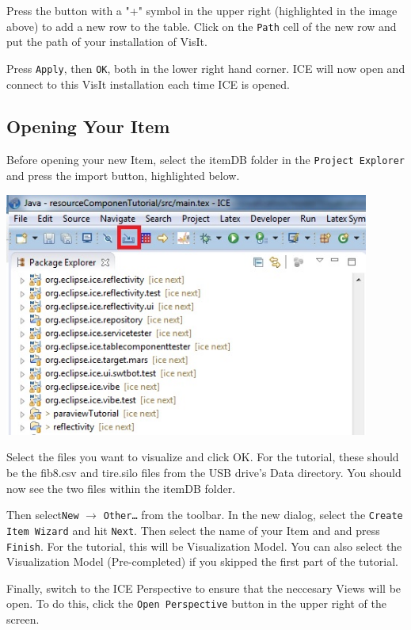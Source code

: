 \documentclass{article}
\begin{document}
Press the button with a "+" symbol in the upper right (highlighted in the image
above) to add a new row to the table. Click on the \texttt{Path} cell of the new
row and put the path of your installation of VisIt.

Press \texttt{Apply}, then \texttt{OK}, both in the lower right hand corner. ICE
will now open and connect to this VisIt installation each time ICE is opened.

\subsection{Opening Your Item}
Before opening your new Item, select the itemDB folder in the \texttt{Project
Explorer} and press the import button, highlighted below.

\begin{center}
\includegraphics[width=12cm]{images/ImportButton}
\end{center}

Select the files you want to visualize and click OK. For the tutorial, these
should be the fib8.csv and tire.silo files from the USB drive's Data directory.
You should now see the two files within the itemDB folder.

Then select\texttt{New} $\rightarrow$ \texttt{Other\ldots} from the toolbar. In
the new dialog, select the \texttt{Create Item Wizard} and hit \texttt{Next}.
Then select the name of your Item and and press \texttt{Finish}. For the
tutorial, this will be Visualization Model. You can also select the
Visualization Model (Pre-completed) if you skipped the first part of the
tutorial.

Finally, switch to the ICE Perspective to ensure that the neccesary Views will
be open. To do this, click the \texttt{Open Perspective} button in the upper right
of the screen.
\end{document}
